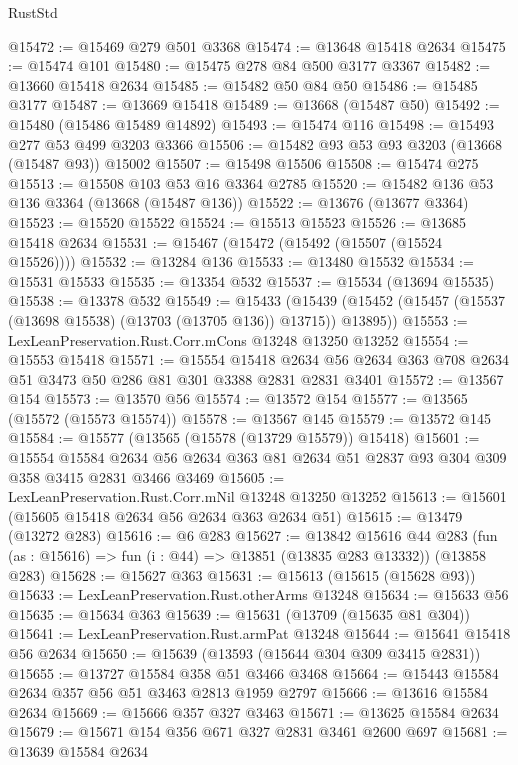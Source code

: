 \begin{lexlean}{RustStd}
\begin{coremodule}
@15472 := @15469 @279 @501 @3368
@15474 := @13648 @15418 @2634
@15475 := @15474 @101
@15480 := @15475 @278 @84 @500 @3177 @3367
@15482 := @13660 @15418 @2634
@15485 := @15482 @50 @84 @50
@15486 := @15485 @3177
@15487 := @13669 @15418
@15489 := @13668 (@15487 @50)
@15492 := @15480 (@15486 @15489 @14892)
@15493 := @15474 @116
@15498 := @15493 @277 @53 @499 @3203 @3366
@15506 := @15482 @93 @53 @93 @3203 (@13668 (@15487 @93)) @15002
@15507 := @15498 @15506
@15508 := @15474 @275
@15513 := @15508 @103 @53 @16 @3364 @2785
@15520 := @15482 @136 @53 @136 @3364 (@13668 (@15487 @136))
@15522 := @13676 (@13677 @3364)
@15523 := @15520 @15522
@15524 := @15513 @15523
@15526 := @13685 @15418 @2634
@15531 := @15467 (@15472 (@15492 (@15507 (@15524 @15526))))
@15532 := @13284 @136
@15533 := @13480 @15532
@15534 := @15531 @15533
@15535 := @13354 @532
@15537 := @15534 (@13694 @15535)
@15538 := @13378 @532
@15549 := @15433
    (@15439 (@15452 (@15457 (@15537 (@13698 @15538) (@13703 (@13705 @136)) @13715)) @13895))
@15553 := LexLeanPreservation.Rust.Corr.mCons @13248 @13250 @13252
@15554 := @15553 @15418
@15571 := @15554
    @15418
    @2634
    @56
    @2634
    @363
    @708
    @2634
    @51
    @3473
    @50
    @286
    @81
    @301
    @3388
    @2831
    @2831
    @3401
@15572 := @13567 @154
@15573 := @13570 @56
@15574 := @13572 @154
@15577 := @13565 (@15572 (@15573 @15574))
@15578 := @13567 @145
@15579 := @13572 @145
@15584 := @15577 (@13565 (@15578 (@13729 @15579)) @15418)
@15601 := @15554
    @15584
    @2634
    @56
    @2634
    @363
    @81
    @2634
    @51
    @2837
    @93
    @304
    @309
    @358
    @3415
    @2831
    @3466
    @3469
@15605 := LexLeanPreservation.Rust.Corr.mNil @13248 @13250 @13252
@15613 := @15601 (@15605 @15418 @2634 @56 @2634 @363 @2634 @51)
@15615 := @13479 (@13272 @283)
@15616 := @6 @283
@15627 := @13842
    @15616
    @44
    @283
    (fun (as : @15616) => fun (i : @44) => @13851 (@13835 @283 @13332))
    (@13858 @283)
@15628 := @15627 @363
@15631 := @15613 (@15615 (@15628 @93))
@15633 := LexLeanPreservation.Rust.otherArms @13248
@15634 := @15633 @56
@15635 := @15634 @363
@15639 := @15631 (@13709 (@15635 @81 @304))
@15641 := LexLeanPreservation.Rust.armPat @13248
@15644 := @15641 @15418 @56 @2634
@15650 := @15639 (@13593 (@15644 @304 @309 @3415 @2831))
@15655 := @13727 @15584 @358 @51 @3466 @3468
@15664 := @15443 @15584 @2634 @357 @56 @51 @3463 @2813 @1959 @2797
@15666 := @13616 @15584 @2634
@15669 := @15666 @357 @327 @3463
@15671 := @13625 @15584 @2634
@15679 := @15671 @154 @356 @671 @327 @2831 @3461 @2600 @697
@15681 := @13639 @15584 @2634

\end{coremodule}
\end{lexlean}
